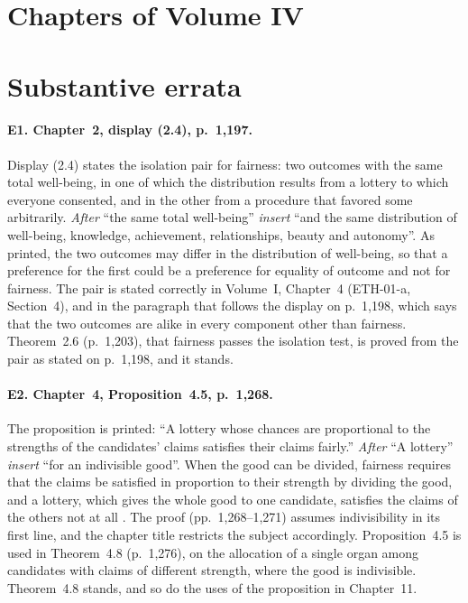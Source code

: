 \documentclass{situationist-preprint}
\begin{document}
\section{Chapters of Volume IV}\label{s:skeleton}



\section{Substantive errata}\label{s:substantive}

\paragraph{E1. Chapter~2, display (2.4), p.~1,197.} Display (2.4) states the isolation pair for fairness: two outcomes with the same total well-being, in one of which the distribution results from a lottery to which everyone consented, and in the other from a procedure that favored some arbitrarily. \textit{After} \enquote{the same total well-being} \textit{insert} \enquote{and the same distribution of well-being, knowledge, achievement, relationships, beauty and autonomy}. As printed, the two outcomes may differ in the distribution of well-being, so that a preference for the first could be a preference for equality of outcome and not for fairness. The pair is stated correctly in Volume~I, Chapter~4 (ETH-01-a, Section~4), and in the paragraph that follows the display on p.~1,198, which says that the two outcomes are alike in every component other than fairness. Theorem~2.6 (p.~1,203), that fairness passes the isolation test, is proved from the pair as stated on p.~1,198, and it stands.

\paragraph{E2. Chapter~4, Proposition~4.5, p.~1,268.} The proposition is printed: \enquote{A lottery whose chances are proportional to the strengths of the candidates' claims satisfies their claims fairly.} \textit{After} \enquote{A lottery} \textit{insert} \enquote{for an indivisible good}. When the good can be divided, fairness requires that the claims be satisfied in proportion to their strength by dividing the good, and a lottery, which gives the whole good to one candidate, satisfies the claims of the others not at all \citep{Broome1990}. The proof (pp.~1,268--1,271) assumes indivisibility in its first line, and the chapter title restricts the subject accordingly. Proposition~4.5 is used in Theorem~4.8 (p.~1,276), on the allocation of a single organ among candidates with claims of different strength, where the good is indivisible. Theorem~4.8 stands, and so do the uses of the proposition in Chapter~11.
\end{document}
